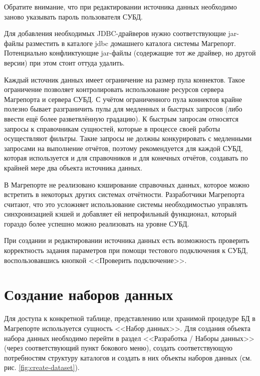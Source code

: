 \documentclass[../user-manual.tex]{subfiles}
\begin{document}
	\begin{NB}
		Обратите внимание, что при редактировании источника данных необходимо заново указывать пароль пользователя СУБД.
	\end{NB}

	\begin{adminnote}
		Для добавления необходимых JDBC-драйверов нужно соответствующие jar-файлы разместить в каталоге jdbc домашнего каталога системы Магрепорт. Потенциально конфликтующие jar-файлы (содержащие тот же драйвер, но другой версии) при этом стоит оттуда удалить.
	\end{adminnote}

	\begin{concept}
		Каждый источник данных имеет ограничение на размер пула коннектов. Такое ограничение позволяет контролировать использование ресурсов сервера Магрепорта и сервера СУБД. С учётом ограниченного пула коннектов крайне полезно бывает разграничить пулы для медленных и быстрых запросов (либо ввести ещё более разветвлённую градацию). К быстрым запросам относятся запросы к справочникам сущностей, которые в процессе своей работы осуществляют фильтры. Такие запросы не должны конкурировать с медленными запросами на выполнение отчётов, поэтому рекомендуется для каждой СУБД, которая используется и для справочников и для конечных отчётов, создавать по крайней мере два объекта источника данных.
	\end{concept}

	\begin{concept}
		В Магрепорте не реализовано кэширование справочных данных, которое можно встретить в некоторых других системах отчётности. Разработчики Магрепорта считают, что это усложняет использование системы необходимостью управлять синхронизацией кэшей и добавляет ей непрофильный функционал, который гораздо более успешно можно реализовать на уровне СУБД.
	\end{concept}
		

	При создании и редактировании источника данных есть возможность проверить корректность задания параметров при помощи тестового подключения к СУБД, воспользовавшись кнопкой <<Проверить подключение>>.
		
	\section{Создание наборов данных}
	
	Для доступа к конкретной таблице, представлению или хранимой процедуре БД в Магрепорте используется сущность <<Набор данных>>. Для создания объекта набора данных необходимо перейти в раздел <<Разработка / Наборы данных>> (через соответствующий пункт бокового меню), создать соответствующую потребностям структуру каталогов и создать в них объекты наборов данных (см. рис. \ref{fig:create-dataset}).
	
\end{document}
